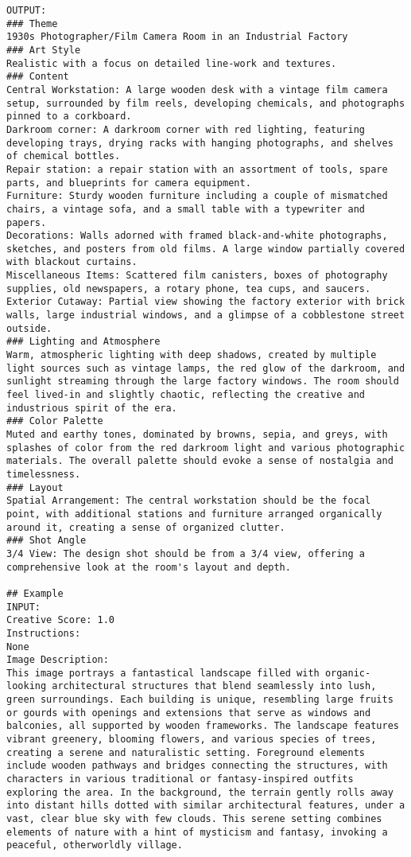 \begin{lstlisting}
OUTPUT:
### Theme
1930s Photographer/Film Camera Room in an Industrial Factory
### Art Style
Realistic with a focus on detailed line-work and textures.
### Content
Central Workstation: A large wooden desk with a vintage film camera setup, surrounded by film reels, developing chemicals, and photographs pinned to a corkboard.
Darkroom corner: A darkroom corner with red lighting, featuring developing trays, drying racks with hanging photographs, and shelves of chemical bottles.
Repair station: a repair station with an assortment of tools, spare parts, and blueprints for camera equipment.
Furniture: Sturdy wooden furniture including a couple of mismatched chairs, a vintage sofa, and a small table with a typewriter and papers.
Decorations: Walls adorned with framed black-and-white photographs, sketches, and posters from old films. A large window partially covered with blackout curtains.
Miscellaneous Items: Scattered film canisters, boxes of photography supplies, old newspapers, a rotary phone, tea cups, and saucers.
Exterior Cutaway: Partial view showing the factory exterior with brick walls, large industrial windows, and a glimpse of a cobblestone street outside.
### Lighting and Atmosphere
Warm, atmospheric lighting with deep shadows, created by multiple light sources such as vintage lamps, the red glow of the darkroom, and sunlight streaming through the large factory windows. The room should feel lived-in and slightly chaotic, reflecting the creative and industrious spirit of the era.
### Color Palette
Muted and earthy tones, dominated by browns, sepia, and greys, with splashes of color from the red darkroom light and various photographic materials. The overall palette should evoke a sense of nostalgia and timelessness.
### Layout
Spatial Arrangement: The central workstation should be the focal point, with additional stations and furniture arranged organically around it, creating a sense of organized clutter.
### Shot Angle
3/4 View: The design shot should be from a 3/4 view, offering a comprehensive look at the room's layout and depth.

## Example 
INPUT:
Creative Score: 1.0
Instructions:
None
Image Description:
This image portrays a fantastical landscape filled with organic-looking architectural structures that blend seamlessly into lush, green surroundings. Each building is unique, resembling large fruits or gourds with openings and extensions that serve as windows and balconies, all supported by wooden frameworks. The landscape features vibrant greenery, blooming flowers, and various species of trees, creating a serene and naturalistic setting. Foreground elements include wooden pathways and bridges connecting the structures, with characters in various traditional or fantasy-inspired outfits exploring the area. In the background, the terrain gently rolls away into distant hills dotted with similar architectural features, under a vast, clear blue sky with few clouds. This serene setting combines elements of nature with a hint of mysticism and fantasy, invoking a peaceful, otherworldly village.


\end{lstlisting}
